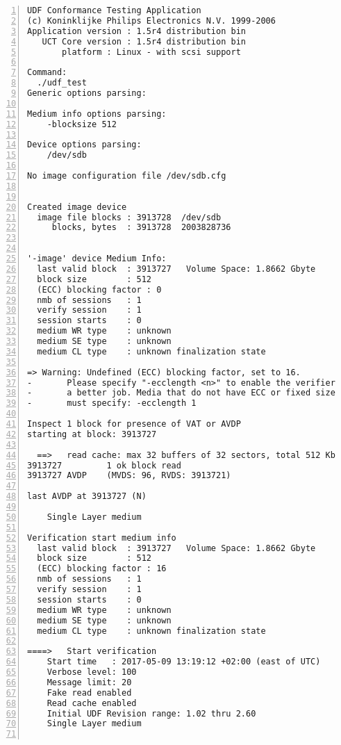 \begin{lstlisting}[frame=single,caption={Výsledek kontroly poškozeného média referenčním programem \texttt{udfct} po pokusu o jeho opravu po \texttt{CHKDSK} mým nástrojem \texttt{udffsck}},label=lst:udfct-chkdsk-po-oprave,basicstyle=\ttfamily\scriptsize, keywordstyle=\color{black}\bfseries\underbar,nolol,numbers=left,texcl=false,escapechar=!]
UDF Conformance Testing Application
(c) Koninklijke Philips Electronics N.V. 1999-2006
Application version : 1.5r4 distribution bin
   UCT Core version : 1.5r4 distribution bin
       platform : Linux - with scsi support

Command:
  ./udf_test
Generic options parsing:

Medium info options parsing:
    -blocksize 512

Device options parsing:
    /dev/sdb

No image configuration file /dev/sdb.cfg


Created image device
  image file blocks : 3913728  /dev/sdb
     blocks, bytes  : 3913728  2003828736


'-image' device Medium Info:
  last valid block  : 3913727   Volume Space: 1.8662 Gbyte
  block size        : 512
  (ECC) blocking factor : 0
  nmb of sessions   : 1
  verify session    : 1
  session starts    : 0       
  medium WR type    : unknown
  medium SE type    : unknown
  medium CL type    : unknown finalization state

=> Warning: Undefined (ECC) blocking factor, set to 16.
-       Please specify "-ecclength <n>" to enable the verifier to do
-       a better job. Media that do not have ECC or fixed size packets
-       must specify: -ecclength 1

Inspect 1 block for presence of VAT or AVDP
starting at block: 3913727

  ==>   read cache: max 32 buffers of 32 sectors, total 512 Kb
3913727         1 ok block read
3913727 AVDP    (MVDS: 96, RVDS: 3913721)

last AVDP at 3913727 (N)

    Single Layer medium

Verification start medium info
  last valid block  : 3913727   Volume Space: 1.8662 Gbyte
  block size        : 512
  (ECC) blocking factor : 16
  nmb of sessions   : 1
  verify session    : 1
  session starts    : 0       
  medium WR type    : unknown
  medium SE type    : unknown
  medium CL type    : unknown finalization state

====>   Start verification
    Start time   : 2017-05-09 13:19:12 +02:00 (east of UTC)
    Verbose level: 100
    Message limit: 20
    Fake read enabled
    Read cache enabled
    Initial UDF Revision range: 1.02 thru 2.60
    Single Layer medium


\end{lstlisting}
